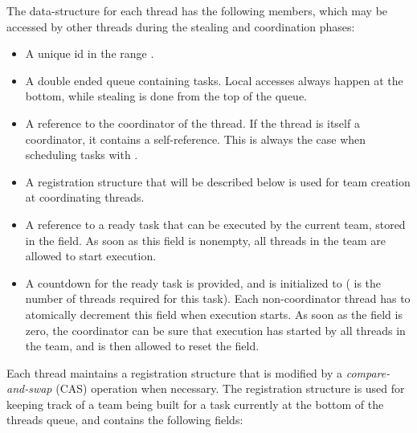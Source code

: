 \documentclass[preprint]{sigplanconf}
\begin{document}
The data-structure for each thread has the following members, which
may be accessed by other threads during the stealing and coordination
phases:
\begin{itemize}
\item
A unique id  in the range .
\item
A double ended queue  containing
tasks. Local accesses always happen at the bottom, while stealing is
done from the top of the queue.
\item
A reference to the coordinator  of the thread. If the thread is 
itself a coordinator, it contains a self-reference. This is always the
case when scheduling tasks with .
\item
A registration structure  that will be described below
is used for team creation at coordinating threads.
\item
A reference to a ready task that can be executed
by the current team, stored in the  field. As soon as this
field is nonempty, all threads in the team are allowed to start
execution.
\item
A countdown  for the ready task is provided, and is initialized to
 ( is the number of threads required for this task). Each
non-coordinator thread has to atomically decrement this field when
execution starts. As soon as the field is zero, the coordinator can be
sure that execution has started by all threads in the team, and is
then allowed to reset the  field.
\end{itemize}

Each thread maintains a registration structure  that is modified by a
\emph{compare-and-swap} (CAS) operation when necessary. The registration
structure is used for keeping track of a team being built for a task
currently at the bottom of the threads queue, and contains the following 
fields:
\end{document}
